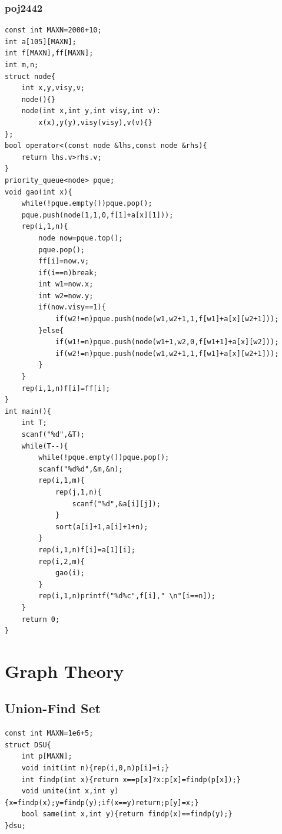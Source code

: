 \documentclass[twoside]{article}
\begin{document}
\subsubsection{poj2442}
\begin{lstlisting}
const int MAXN=2000+10;
int a[105][MAXN];
int f[MAXN],ff[MAXN];
int m,n;
struct node{
    int x,y,visy,v;
    node(){}
    node(int x,int y,int visy,int v):
        x(x),y(y),visy(visy),v(v){}
};
bool operator<(const node &lhs,const node &rhs){
    return lhs.v>rhs.v;
}
priority_queue<node> pque;
void gao(int x){
    while(!pque.empty())pque.pop();
    pque.push(node(1,1,0,f[1]+a[x][1]));
    rep(i,1,n){
        node now=pque.top();
        pque.pop();
        ff[i]=now.v;
        if(i==n)break;
        int w1=now.x;
        int w2=now.y;
        if(now.visy==1){
            if(w2!=n)pque.push(node(w1,w2+1,1,f[w1]+a[x][w2+1]));
        }else{
            if(w1!=n)pque.push(node(w1+1,w2,0,f[w1+1]+a[x][w2]));
            if(w2!=n)pque.push(node(w1,w2+1,1,f[w1]+a[x][w2+1]));
        }
    }
    rep(i,1,n)f[i]=ff[i];
}
int main(){
    int T;
    scanf("%d",&T);
    while(T--){
        while(!pque.empty())pque.pop();
        scanf("%d%d",&m,&n);
        rep(i,1,m){
            rep(j,1,n){
                scanf("%d",&a[i][j]);
            }
            sort(a[i]+1,a[i]+1+n);
        }
        rep(i,1,n)f[i]=a[1][i];
        rep(i,2,m){
            gao(i);
        }
        rep(i,1,n)printf("%d%c",f[i]," \n"[i==n]);
    }
    return 0;
}
\end{lstlisting}
\clearpage\section{Graph Theory}
\subsection{Union-Find Set}
\begin{lstlisting}
const int MAXN=1e6+5;
struct DSU{
    int p[MAXN];
    void init(int n){rep(i,0,n)p[i]=i;}
    int findp(int x){return x==p[x]?x:p[x]=findp(p[x]);}
    void unite(int x,int y){x=findp(x);y=findp(y);if(x==y)return;p[y]=x;}
    bool same(int x,int y){return findp(x)==findp(y);}
}dsu;
\end{lstlisting}
\end{document}
